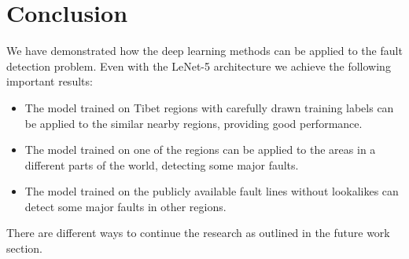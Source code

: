 \documentclass[11pt,a4paper]{article}
\begin{document}
\section{Conclusion}
We have demonstrated how the deep learning methods can be applied to the fault detection problem. Even with the LeNet-5
architecture we achieve the following important results:
\begin{itemize}
    \item The model trained on Tibet regions with carefully drawn training labels can be applied to the similar
    nearby regions, providing good performance.
    \item The model trained on one of the regions can be applied to the areas in a different parts of the world,
    detecting some major faults.
    \item The model trained on the publicly available fault lines without lookalikes can detect some major faults in other regions.
\end{itemize}
There are different ways to continue the research as outlined in the future work section.

\printbibliography
\end{document}
